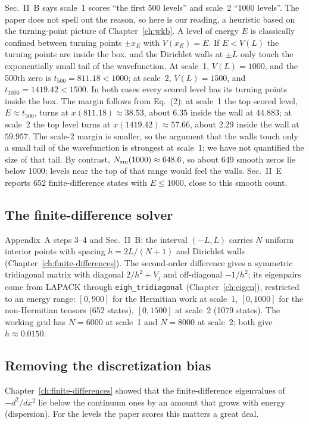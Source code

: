 Sec.~II~B says scale~1 scores ``the first 500 levels'' and scale~2 ``1000 levels''. The paper does not spell out the reason, so here is our reading, a heuristic based on the turning-point picture of Chapter~\ref{ch:wkb}. A level of energy $E$ is classically confined between turning points $\pm x_E$ with $V(x_E)=E$. If $E<V(L)$ the turning points are inside the box, and the Dirichlet walls at $\pm L$ only touch the exponentially small tail of the wavefunction. At scale~1, $V(L)=1000$, and the 500th zero is $t_{500}=811.18<1000$; at scale~2, $V(L)=1500$, and $t_{1000}=1419.42<1500$. In both cases every scored level has its turning points inside the box. The margin follows from Eq.~(2): at scale~1 the top scored level, $E\approx t_{500}$, turns at $x(811.18)\approx38.53$, about $6.35$ inside the wall at $44.883$; at scale~2 the top level turns at $x(1419.42)\approx57.66$, about $2.29$ inside the wall at $59.957$. The scale-2 margin is smaller, so the argument that the walls touch only a small tail of the wavefunction is strongest at scale~1; we have not quantified the size of that tail. By contrast, $N_{\mathrm{sm}}(1000)\approx648.6$, so about 649 smooth zeros lie below 1000; levels near the top of that range would feel the walls. Sec.~II~E reports 652 finite-difference states with $E\le1000$, close to this smooth count.

\subsection{The finite-difference solver}

Appendix~A steps 3--4 and Sec.~II~B: the interval $(-L,L)$ carries $N$ uniform interior points with spacing $h=2L/(N+1)$ and Dirichlet walls (Chapter~\ref{ch:finite-differences}). The second-order difference gives a symmetric tridiagonal matrix with diagonal $2/h^2+V_j$ and off-diagonal $-1/h^2$; its eigenpairs come from LAPACK through \texttt{eigh\_tridiagonal} (Chapter~\ref{ch:eigen}), restricted to an energy range: $[0,900]$ for the Hermitian work at scale~1, $[0,1000]$ for the non-Hermitian tensors (652 states), $[0,1500]$ at scale~2 (1079 states). The working grid has $N=6000$ at scale~1 and $N=8000$ at scale~2; both give $h\approx0.0150$.

\subsection{Removing the discretization bias}

Chapter~\ref{ch:finite-differences} showed that the finite-difference eigenvalues of $-d^2/dx^2$ lie below the continuum ones by an amount that grows with energy (dispersion). For the levels the paper scores this matters a great deal.

